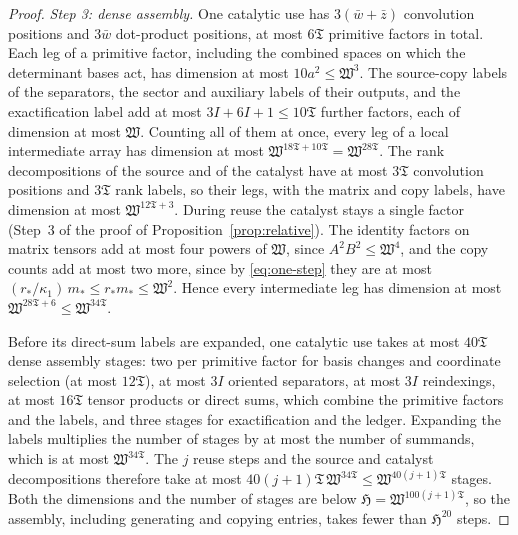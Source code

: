 \begin{proof}
\emph{Step 3: dense assembly.} One catalytic use has
\(3(\bar w+\bar z)\) convolution positions and \(3\bar w\) dot-product
positions, at most \(6\mathfrak T\) primitive factors in total. Each leg
of a primitive factor, including the combined spaces on which the
determinant bases act, has dimension at most \(10a^2\le\mathfrak W^3\).
The source-copy labels of the separators, the sector and auxiliary
labels of their outputs, and the exactification label add at most
\(3I+6I+1\le10\mathfrak T\) further factors, each of dimension at most
\(\mathfrak W\). Counting all of them at once, every leg of a local
intermediate array has dimension at most
\(\mathfrak W^{18\mathfrak T+10\mathfrak T}=\mathfrak W^{28\mathfrak T}\).
The rank decompositions of the source and of the catalyst have at most
\(3\mathfrak T\) convolution positions and \(3\mathfrak T\) rank labels,
so their legs, with the matrix and copy labels, have dimension at most
\(\mathfrak W^{12\mathfrak T+3}\). During reuse the catalyst stays a
single factor (Step~3 of the proof of Proposition~\ref{prop:relative}).
The identity factors on matrix tensors add at most four powers of
\(\mathfrak W\), since \(A^2B^2\le\mathfrak W^4\), and the copy counts
add at most two more, since by \eqref{eq:one-step} they are at most
\((r_*/\kappa_1)\,m_*\le r_*m_*\le\mathfrak W^2\). Hence every
intermediate leg has dimension at most
\(\mathfrak W^{28\mathfrak T+6}\le\mathfrak W^{34\mathfrak T}\).

Before its direct-sum labels are expanded, one catalytic use takes at
most \(40\mathfrak T\) dense assembly stages: two per primitive factor
for basis changes and coordinate selection (at most \(12\mathfrak T\)),
at most \(3I\) oriented separators, at most \(3I\) reindexings, at most
\(16\mathfrak T\) tensor products or direct sums, which combine the
primitive factors and the labels, and three stages for exactification
and the ledger. Expanding the labels multiplies the number of stages by
at most the number of summands, which is at most
\(\mathfrak W^{34\mathfrak T}\). The \(j\) reuse steps and the source
and catalyst decompositions therefore take at most
\(40(j+1)\mathfrak T\,\mathfrak W^{34\mathfrak T}
\le\mathfrak W^{40(j+1)\mathfrak T}\) stages. Both the dimensions and
the number of stages are below
\(\mathfrak H=\mathfrak W^{100(j+1)\mathfrak T}\), so the assembly,
including generating and copying entries, takes fewer than
\(\mathfrak H^{20}\) steps.


\end{proof}
